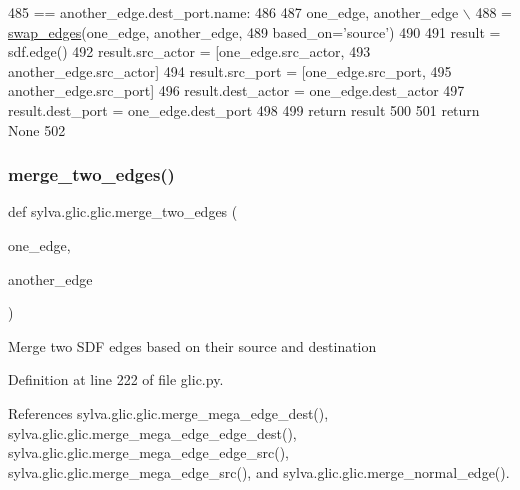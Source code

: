 \begin{DoxyCode}
485                 == another\_edge.dest\_port.name:
486 
487             one\_edge, another\_edge \(\backslash\)
488                 = \hyperlink{namespacesylva_1_1glic_1_1glic_aa33f0fa18db2dc181313352cfdbc0cca}{swap\_edges}(one\_edge, another\_edge,
489                              based\_on=\textcolor{stringliteral}{'source'})
490 
491             result = sdf.edge()
492             result.src\_actor = [one\_edge.src\_actor,
493                                 another\_edge.src\_actor]
494             result.src\_port = [one\_edge.src\_port,
495                                another\_edge.src\_port]
496             result.dest\_actor = one\_edge.dest\_actor
497             result.dest\_port = one\_edge.dest\_port
498 
499             \textcolor{keywordflow}{return} result
500 
501         \textcolor{keywordflow}{return} \textcolor{keywordtype}{None}
502 
\end{DoxyCode}
\mbox{\label{namespacesylva_1_1glic_1_1glic_a3230a4ec28a3787a073288b4532675cc}} 
\subsubsection{\texorpdfstring{merge\+\_\+two\+\_\+edges()}{merge\_two\_edges()}}
{\footnotesize\ttfamily def sylva.\+glic.\+glic.\+merge\+\_\+two\+\_\+edges (\begin{DoxyParamCaption}\item[{}]{one\+\_\+edge,  }\item[{}]{another\+\_\+edge }\end{DoxyParamCaption})}

\begin{DoxyVerb}Merge two SDF edges based on their source and destination \end{DoxyVerb}
 

Definition at line 222 of file glic.\+py.



References sylva.\+glic.\+glic.\+merge\+\_\+mega\+\_\+edge\+\_\+dest(), sylva.\+glic.\+glic.\+merge\+\_\+mega\+\_\+edge\+\_\+edge\+\_\+dest(), sylva.\+glic.\+glic.\+merge\+\_\+mega\+\_\+edge\+\_\+edge\+\_\+src(), sylva.\+glic.\+glic.\+merge\+\_\+mega\+\_\+edge\+\_\+src(), and sylva.\+glic.\+glic.\+merge\+\_\+normal\+\_\+edge().



